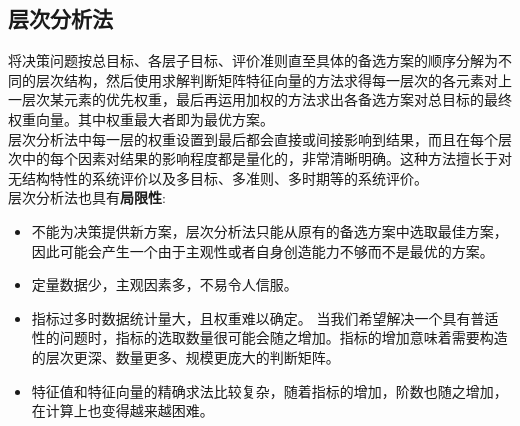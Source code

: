 \documentclass[openany]{progbookcn}
\begin{document}
\subsection{层次分析法}
\indent 将决策问题按总目标、各层子目标、评价准则直至具体的备选方案的顺序分解为不同的层次结构，然后使用求解判断矩阵特征向量的方法求得每一层次的各元素对上一层次某元素的优先权重，最后再运用加权的方法求出各备选方案对总目标的最终权重向量。其中权重最大者即为最优方案。\\
\indent 层次分析法中每一层的权重设置到最后都会直接或间接影响到结果，而且在每个层次中的每个因素对结果的影响程度都是量化的，非常清晰明确。这种方法擅长于对无结构特性的系统评价以及多目标、多准则、多时期等的系统评价。\\
\indent 层次分析法也具有\textbf{局限性}:
\begin{itemize}
\item 不能为决策提供新方案，层次分析法只能从原有的备选方案中选取最佳方案，因此可能会产生一个由于主观性或者自身创造能力不够而不是最优的方案。
\item 定量数据少，主观因素多，不易令人信服。
\item 指标过多时数据统计量大，且权重难以确定。 当我们希望解决一个具有普适性的问题时，指标的选取数量很可能会随之增加。指标的增加意味着需要构造的层次更深、数量更多、规模更庞大的判断矩阵。
\item 特征值和特征向量的精确求法比较复杂，随着指标的增加，阶数也随之增加，在计算上也变得越来越困难。
\end{itemize}
\end{document}
